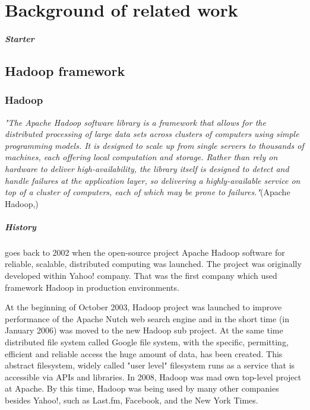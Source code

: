 \documentclass[a4paper,12pt,oneside]{report}
\begin{document}
 



\newpage
\chapter*{Background of related work}
\paragraph*{Starter}

\section{Hadoop framework}
\label{sec:hadoop}
		\subsection*{Hadoop}
		\emph{"The Apache Hadoop software library is a framework that allows for the distributed
		  processing of large data sets across clusters of computers using simple programming 
		  models. It is designed to scale up from single servers to 
		 thousands of machines, each offering local computation and storage. Rather than rely 
		 on hardware to deliver high-availability, the library itself is
		  designed to detect and handle failures at the application layer, so delivering a 
		  highly-available service on top of a cluster of computers,
		  each of which may be prone to failures."}(Apache Hadoop,\cite{hadoop_web})
		\paragraph*{History}goes back to 2002 when the 
open-source project Apache Hadoop software for reliable, scalable,
distributed computing was launched. The project was originally
developed within Yahoo! company. That was the first company
which used framework Hadoop in production environments.

At the beginning of October 2003, Hadoop project was launched to improve performance
of the Apache Nutch\cite{nutch_web} web search engine and in the short time (in January 2006) was moved to the new Hadoop sub project.
At the same time  distributed file system called Google
file system\cite{google_fs}, with the specific, permitting, efficient and reliable access
the huge amount of data, has been created. This abstract filesystem, widely called "user level"
filesystem runs as a service that is accessible via APIs and libraries. 
In 2008, Hadoop was mad own top-level project at Apache.\cite{hadoop_web_news} By this time, Hadoop was being used by many
other companies besides Yahoo!, such as Last.fm, Facebook, and the New York Times. 
\end{document}
